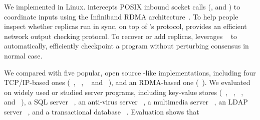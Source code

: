 


We implemented \xxx in Linux. \xxx intercepts POSIX inbound socket calls
(\eg, \accept and \recv) to coordinate inputs using the Infiniband
RDMA architecture~\cite{infiniband}. To help people inspect whether replicas 
run in sync, on top of \xxx's \paxos protocol, \xxx provides an efficient 
network output checking protocol. To recover or add replicas, \xxx 
leverages \criu~\cite{criu} to automatically, efficiently checkpoint a program 
without perturbing consensus in normal case.


We compared \xxx with five popular, open source \paxos-like implementations,
including four TCP/IP-based ones (\libpaxos~\cite{libpaxos},
\zookeeper~\cite{zookeeper}, \crane~\cite{crane:sosp15} and
\spaxos~\cite{spaxos:srds12}), and an RDMA-based one 
(\dare~\cite{dare:hpdc15}). We evaluated \xxx on \nprog widely used or studied 
server programs, including
\nkvprog key-value stores (\redis~\cite{redis}, \memcached~\cite{memcached},
\ssdb~\cite{ssdb}, and \mongodb~\cite{mongodb}), a SQL server
\mysql~\cite{mysql}, an anti-virus server \clamav~\cite{clamav}, a multimedia
server \mediatomb~\cite{mediatomb}, an LDAP server \openldap~\cite{openldap}, 
and a transactional database \calvin~\cite{calvin:sigmod12}. Evaluation shows 
that


